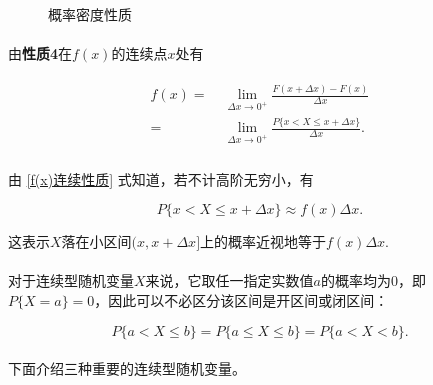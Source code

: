 \begin{figure}[h]
\centering
  \begin{subfigure}[t]{0.48\linewidth}
    \centering
      
  \end{subfigure}
  \begin{subfigure}[t]{0.48\linewidth}
    \centering
      
  \end{subfigure}
  \caption{概率密度性质}
  \label{概率密度性质}
\end{figure}

\paragraph{}
由\textbf{性质4}在$f(x)$的连续点$x$处有

\begin{align}
  \label{f(x)连续性质}
  \begin{split}
    f(x) =&\; \lim_{\Delta x \to 0^+}\frac{F(x+\Delta x) - F(x)}{\Delta x} \\
    =&\; \lim_{\Delta x \to 0^+}\frac{P\{x < X \leq x + \Delta x\}}{\Delta x}.
  \end{split}
\end{align}

\paragraph{}
由 \eqref{f(x)连续性质} 式知道，若不计高阶无穷小，有

\begin{equation}
  P\{x < X \leq x + \Delta x\} \approx f(x)\Delta x.
\end{equation}

这表示$X$落在小区间$(x, x+\Delta x]$上的概率近视地等于$f(x)\Delta x$.

\paragraph{}
对于连续型随机变量$X$来说，它取任一指定实数值$a$的概率均为$0$，即$P\{X=a\}=0$，因此可以不必区分该区间是开区间或闭区间：

\begin{equation}
  P\{a < X \leq b\} = P\{a \leq X \leq b\} = P\{a < X < b\}.
\end{equation}

\paragraph{}
下面介绍三种重要的连续型随机变量。

